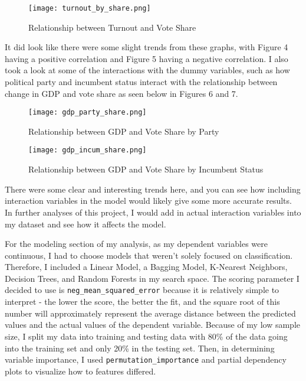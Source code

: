 \documentclass[12pt]{article}
\begin{document}
\vspace{3.00mm}

\begin{figure}[H]
    \centering
    \texttt{[image: turnout\_by\_share.png]}
    \caption{Relationship between Turnout and Vote Share}
\end{figure}

It did look like there were some slight trends from these graphs, with Figure 4 having a positive correlation and Figure 5 having a negative correlation. I also took a look at some of the interactions with the dummy variables, such as how political party and incumbent status interact with the relationship between change in GDP and vote share as seen below in Figures 6 and 7.

\begin{figure}[H]
    \centering
    \texttt{[image: gdp\_party\_share.png]}
    \caption{Relationship between GDP and Vote Share by Party}
\end{figure}

\vspace{3.00mm}

\begin{figure}[H]
    \centering
    \texttt{[image: gdp\_incum\_share.png]}
    \caption{Relationship between GDP and Vote Share by Incumbent Status}
\end{figure}

There were some clear and interesting trends here, and you can see how including interaction variables in the model would likely give some more accurate results. In further analyses of this project, I would add in actual interaction variables into my dataset and see how it affects the model.

\vspace{3.00mm}

For the modeling section of my analysis, as my dependent variables were continuous, I had to choose models that weren't solely focused on classification. Therefore, I included a Linear Model, a Bagging Model, K-Nearest Neighbors, Decision Trees, and Random Forests in my search space. The scoring parameter I decided to use is \verb|neg_mean_squared_error| because it is relatively simple to interpret - the lower the score, the better the fit, and the square root of this number will approximately represent the average distance between the predicted values and the actual values of the dependent variable. Because of my low sample size, I split my data into training and testing data with 80\% of the data going into the training set and only 20\% in the testing set. Then, in determining variable importance, I used \verb|permutation_importance| and partial dependency plots to visualize how to features differed. 
\end{document}
